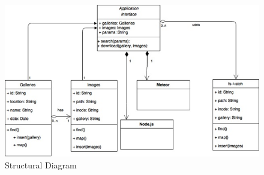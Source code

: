 \begin{figure}[h!]
  \begin{center}
    \caption{Structural Diagram}
    \includegraphics[width=\textwidth]{images/StructuralDiagram.jpg}
  \end{center}
\end{figure}